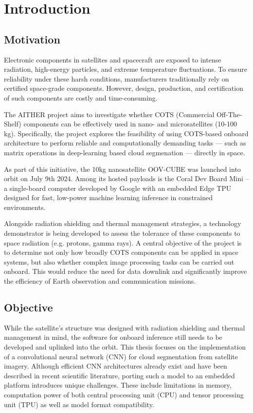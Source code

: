 {

\setlength{\parindent}{0pt}
\setlength{\parskip}{1em}

\chapter{Introduction}
\section{Motivation}

Electronic components in satellites and spacecraft are exposed to intense radiation, high-energy particles, and extreme temperature fluctuations. To ensure reliability under these harsh conditions, manufacturers traditionally rely on certified space-grade components. However, design, production, and certification of such components are costly and time\--con\-su\-ming. 

The AITHER project aims to investigate whether COTS (Commercial Off-The-Shelf) components can be effectively used in nano- and microsatellites (10-100 kg). Specifically, the project explores the feasibility of using COTS-based onboard architecture to perform reliable and computationally demanding tasks --- such as matrix operations in deep-learning based cloud segmenation --- directly in space. 

As part of this initiative, the 10kg nanosatellite OOV-CUBE was launched into orbit on July 9th 2024. Among its hosted payloads is the Coral Dev Board Mini – a single-board computer developed by Google with an embedded Edge TPU designed for fast, low-power machine learning inference in constrained environments.

Alongside radiation shielding and thermal management strategies, a technology demonstrator is being developed to assess the tolerance of these components to space radiation (e.g. protons, gamma rays). A central objective of the project is to determine not only how broadly COTS components can be applied in space systems, but also whether complex image processing tasks can be carried out onboard. This would reduce the need for data downlink and significantly improve the efficiency of Earth observation and communication missions.

\section{Objective}

While the satellite's structure was designed with radiation shielding and thermal management in mind, the software for onboard inference still needs to be developed and uplinked into the orbit. This thesis focuses on the implementation of a convolutional neural network (CNN) for cloud segmentation from satellite imagery. Although efficient CNN architectures already exist and have been described in recent scientific literature, porting such a model to an embedded platform introduces unique challenges. These include limitations in memory, computation power of both central processing unit (CPU) and tensor processing unit (TPU) as well as model format compatibility.

}
